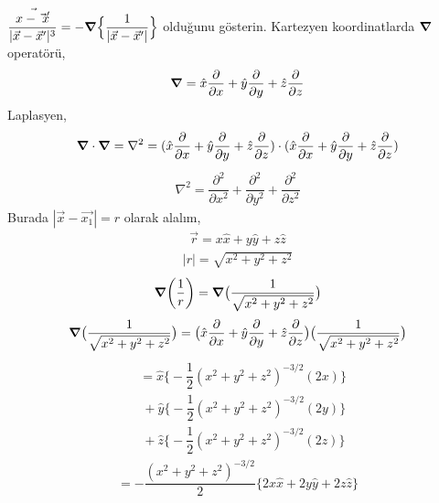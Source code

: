 \begin{tcolorbox}
$\dfrac{\Vec{x - \Vec{x}'}}{|\Vec{x} - \Vec{x}'|^{3}} = - \grad \Big\{  \dfrac{1}{|\Vec{x} - \Vec{x}'|}  \Big\}$ olduğunu gösterin.
\noindent Kartezyen koordinatlarda $\grad$ operatörü,
\begin{align*}
    \grad = \hat{x} \dfrac{\partial}{\partial x} + \hat{y} \dfrac{\partial}{\partial y} + \hat{z} \dfrac{\partial}{\partial z}
\end{align*}
Laplasyen,
\begin{align*}
  \grad \cdot \grad  =  \nabla^{2} = (  \hat{x} \dfrac{\partial}{\partial x} + \hat{y} \dfrac{\partial}{\partial y} + \hat{z} \dfrac{\partial}{\partial z} ) \cdot (  \hat{x} \dfrac{\partial}{\partial x} + \hat{y} \dfrac{\partial}{\partial y} + \hat{z} \dfrac{\partial}{\partial z} )
\end{align*}
\begin{align*}
    \nabla^{2} =  \dfrac{\partial^{2}}{\partial x^{2}} + \dfrac{\partial^{2}}{\partial y^{2}} + \dfrac{\partial^{2}}{\partial z^{2}} 
\end{align*}
Burada $|\Vec{x} - \Vec{x_{1}}| = r $ olarak alalım,
\begin{align*}
    \Vec{r} = x \hat{x} + y \hat{y} + z \hat{z}
\end{align*}
\begin{align*}
|r| = \sqrt{x^{2} + y^{2}  + z^{2} }
\end{align*}
\begin{align*}
  \grad(\dfrac{1}{r}) = \grad \big( \dfrac{1}{\sqrt{x^{2} + y^{2} + z^{2}}}  \big) 
\end{align*}
\begin{align*}
 \grad \big( \dfrac{1}{\sqrt{x^{2} + y^{2} + z^{2}}}  \big) = \big(  \hat{x} \dfrac{\partial}{\partial x} + \hat{y} \dfrac{\partial}{\partial y} + \hat{z} \dfrac{\partial}{\partial z} \big) \big( \dfrac{1}{\sqrt{x^{2} + y^{2} + z^{2}}}  \big)
\end{align*}
\begin{align*}
&= \hat{x}  \bigg\{ - \dfrac{1}{2} (x^{2} + y^{2} + z^{2})^{-3/2} (2x) \bigg\} \\
&\ + \hat{y} \bigg\{ - \dfrac{1}{2} (x^{2} + y^{2} + z^{2})^{-3/2} (2y) \bigg\} \\
&\ + \hat{z} \bigg\{ - \dfrac{1}{2} (x^{2} + y^{2} + z^{2})^{-3/2} (2z) \bigg\} 
\end{align*}
\begin{align*}
    = - \dfrac{(x^{2} + y^{2} + z^{2})^{-3/2}}{2}  \bigg\{ 2x \hat{x} + 2y \hat{y} + 2z \hat{z} \bigg\} 

\end{align*}
\end{tcolorbox}
